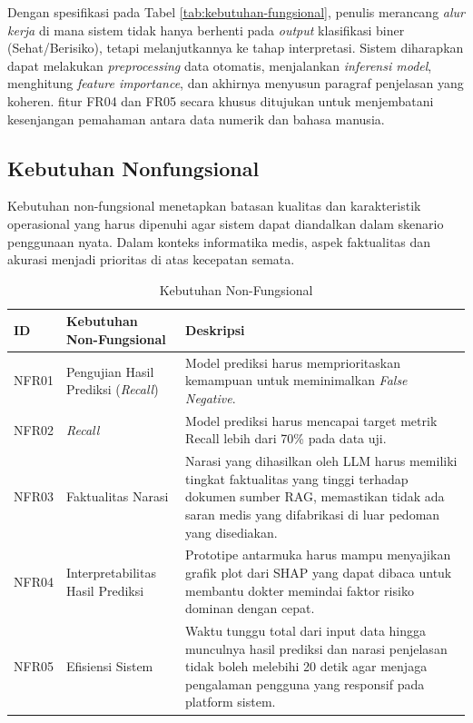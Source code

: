 Dengan spesifikasi pada Tabel \ref{tab:kebutuhan-fungsional}, penulis merancang \textit{alur kerja} di mana sistem tidak hanya berhenti pada \textit{output} klasifikasi biner (Sehat/Berisiko), tetapi melanjutkannya ke tahap interpretasi. Sistem diharapkan dapat melakukan \textit{preprocessing} data otomatis, menjalankan \textit{inferensi model}, menghitung \textit{feature importance}, dan akhirnya menyusun paragraf penjelasan yang koheren. fitur FR04 dan FR05 secara khusus ditujukan untuk menjembatani kesenjangan pemahaman antara data numerik dan bahasa manusia.

\subsection{Kebutuhan Nonfungsional}
Kebutuhan non-fungsional menetapkan batasan kualitas dan karakteristik operasional yang harus dipenuhi agar sistem dapat diandalkan dalam skenario penggunaan nyata. Dalam konteks informatika medis, aspek faktualitas dan akurasi menjadi prioritas di atas kecepatan semata.

\begin{table}[ht]
    \caption{Kebutuhan Non-Fungsional}
    \label{tab:kebutuhan-nonfungsional}
    \centering
    \small
    \begin{tabular}{|p{1.5cm}|p{3.5cm}|p{8cm}|}
        \hline
        \textbf{ID} & \textbf{Kebutuhan Non-Fungsional} & \textbf{Deskripsi} \\
        \hline
        NFR01 & Pengujian Hasil Prediksi (\textit{Recall}) & Model prediksi harus memprioritaskan kemampuan untuk meminimalkan \textit{False Negative}. \\
        \hline
        NFR02 & \textit{Recall} & Model prediksi harus mencapai target metrik Recall lebih dari 70\% pada data uji. \\
        \hline
        NFR03 & Faktualitas Narasi & Narasi yang dihasilkan oleh LLM harus memiliki tingkat faktualitas yang tinggi terhadap dokumen sumber RAG, memastikan tidak ada saran medis yang difabrikasi di luar pedoman yang disediakan.  \\
        \hline
        NFR04 & Interpretabilitas Hasil Prediksi & Prototipe antarmuka harus mampu menyajikan grafik plot dari SHAP yang dapat dibaca untuk membantu dokter memindai faktor risiko dominan dengan cepat. \\
        \hline
        NFR05 & Efisiensi Sistem & Waktu tunggu total dari input data hingga munculnya hasil prediksi dan narasi penjelasan tidak boleh melebihi 20 detik agar menjaga pengalaman pengguna yang responsif pada platform sistem. \\
        \hline
    \end{tabular}
\end{table}


